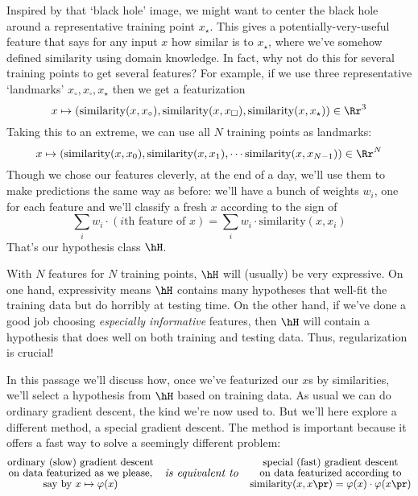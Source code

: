 

  Inspired by that `black hole' image, we might want to center the black hole
  around a representative training point $x_\star$.
  This gives a potentially-very-useful feature that says for any input $x$
  how similar is to $x_\star$, where we've somehow defined
  $\text{similarity}$ using domain knowledge.
  In fact, why not do this for several training
  points to get several features?  For example, if we use three representative
  `landmarks' $x_\circ, x_\square, x_\star$ then we get a featurization
  $$
    x \mapsto (\text{similarity}(x, x_\circ),
               \text{similarity}(x, x_\square),
               \text{similarity}(x, x_\star))
    \in \Rr^3
  $$
  Taking this to an extreme, we can use all $N$ training points as landmarks:
  $$
    x \mapsto (\text{similarity}(x, x_0),
               \text{similarity}(x, x_1),
                \cdots
               \text{similarity}(x, x_{N-1}))
    \in \Rr^N
  $$
  Though we chose our features cleverly, at the end of a day, we'll use them
  to make predictions the same way as before: we'll have a bunch of weights
  $w_i$, one for each feature and we'll classify a fresh $x$ according to the
  sign of
  $$
    \sum_i w_i \cdot (\text{$i$th feature of $x$})
    =
    \sum_i w_i \cdot \text{similarity}(x, x_i)
  $$
  That's our hypothesis class $\hH$.

  With $N$ features for $N$ training points, $\hH$ will (usually) be very
  expressive.
  On one hand, expressivity means $\hH$ contains many hypotheses that well-fit
  the training data but do horribly at testing time.
  On the other hand, if we've done a good job choosing \emph{especially
  informative} features, then $\hH$ will contain a hypothesis that does well on
  both training and testing data.
  Thus, regularization is crucial!

\newpage
{}%
  In this passage we'll discuss how, once we've featurized our $x$s by
  similarities, we'll select a hypothesis from $\hH$ based on
  training data.  As usual we can do ordinary gradient descent, the kind we're
  now used to.  But we'll here explore a different method, a special gradient descent.  The method
  is important because it offers a fast way to solve a seemingly different
  problem:
  $$
    \substack{\text{\small ordinary (slow) gradient descent}\\%
              \text{\small on data featurized as we please,}\\%
              \text{\small say by $x\mapsto \varphi(x)$}}
    \quad\text{\emph{is equivalent to}}\quad
    \substack{\text{\small special (fast) gradient descent}\\%
              \text{\small on data featurized according to}\\%
              \text{\small $\text{similarity}(x,x\pr)=\varphi(x)\cdot\varphi(x\pr)$}}
  $$

